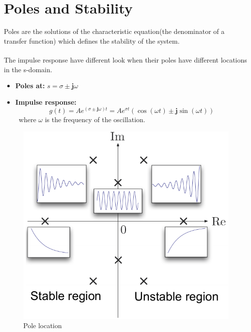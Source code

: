\section{Poles and Stability}
Poles are the solutions of the characteristic equation(the denominator of a transfer function) which defines the stability of the system.\\\\
The impulse response have different look when their poles have different locations in the s-domain.
\begin{itemize}
    \item \textbf{Poles at:} $s = \sigma \pm \mathbf{j}\omega$
    
    \item \textbf{Impulse response:}
    \[ g(t) = Ae^{(\sigma \pm \mathbf{j}\omega)t} = Ae^{\sigma t}(\cos(\omega t)\pm\mathbf{j}\sin(\omega t))\]
    \ where $\omega$ is the frequency of the oscillation.
\end{itemize}

\begin{figure}[H] 
    \centering
    \includegraphics[width=.45\textwidth]{images/pole_location.pdf}
    \caption{Pole location}
\end{figure}

